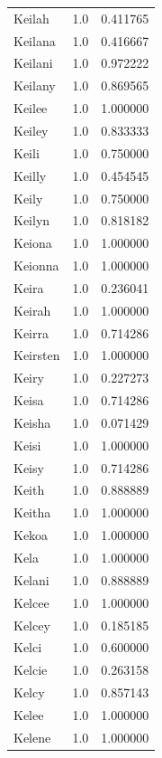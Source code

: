 \documentclass[
  letterpaper,
  DIV=11,
  numbers=noendperiod]{scrreprt}
\begin{document}
\begin{tabular}{lrr}
Keilah          &   1.0 &   0.411765 \\
Keilana         &   1.0 &   0.416667 \\
Keilani         &   1.0 &   0.972222 \\
Keilany         &   1.0 &   0.869565 \\
Keilee          &   1.0 &   1.000000 \\
Keiley          &   1.0 &   0.833333 \\
Keili           &   1.0 &   0.750000 \\
Keilly          &   1.0 &   0.454545 \\
Keily           &   1.0 &   0.750000 \\
Keilyn          &   1.0 &   0.818182 \\
Keiona          &   1.0 &   1.000000 \\
Keionna         &   1.0 &   1.000000 \\
Keira           &   1.0 &   0.236041 \\
Keirah          &   1.0 &   1.000000 \\
Keirra          &   1.0 &   0.714286 \\
Keirsten        &   1.0 &   1.000000 \\
Keiry           &   1.0 &   0.227273 \\
Keisa           &   1.0 &   0.714286 \\
Keisha          &   1.0 &   0.071429 \\
Keisi           &   1.0 &   1.000000 \\
Keisy           &   1.0 &   0.714286 \\
Keith           &   1.0 &   0.888889 \\
Keitha          &   1.0 &   1.000000 \\
Kekoa           &   1.0 &   1.000000 \\
Kela            &   1.0 &   1.000000 \\
Kelani          &   1.0 &   0.888889 \\
Kelcee          &   1.0 &   1.000000 \\
Kelcey          &   1.0 &   0.185185 \\
Kelci           &   1.0 &   0.600000 \\
Kelcie          &   1.0 &   0.263158 \\
Kelcy           &   1.0 &   0.857143 \\
Kelee           &   1.0 &   1.000000 \\
Kelene          &   1.0 &   1.000000 \\

\end{tabular}
\end{document}
